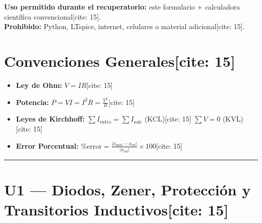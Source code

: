 \documentclass[10pt, a4paper]{article}
\begin{document}
\begin{tcolorbox}[colback=ucbblue!5, colframe=ucbblue, title=\textbf{Formulario Autorizado — Recuperatorio U1 + U2[cite: 15]}]
    \textbf{Uso permitido durante el recuperatorio:} este formulario + calculadora científica convencional[cite: 15]. \\
    \textbf{Prohibido:} Python, LTspice, internet, celulares o material adicional[cite: 15].
\end{tcolorbox}

\section*{Convenciones Generales[cite: 15]}
\noindent\begin{minipage}[t]{0.48\textwidth}
    \begin{itemize}
        \item \textbf{Ley de Ohm:} $V = I R$[cite: 15]
        \item \textbf{Potencia:} $P = V I = I^2 R = \frac{V^2}{R}$[cite: 15]
    \end{itemize}
\end{minipage}\hfill
\begin{minipage}[t]{0.48\textwidth}
    \begin{itemize}
        \item \textbf{Leyes de Kirchhoff:} $\sum I_{\text{entra}} = \sum I_{\text{sale}}$ (KCL)[cite: 15] \quad $\sum V = 0$ (KVL)[cite: 15]
        \item \textbf{Error Porcentual:} $\%\text{error} = \frac{|x_{\text{med}} - x_{\text{ref}}|}{|x_{\text{ref}}|} \times 100$[cite: 15]
    \end{itemize}
\end{minipage}

\vspace{0.3cm}
\hrule
\vspace{0.3cm}

\section*{U1 — Diodos, Zener, Protección y Transitorios Inductivos[cite: 15]}
\end{document}
